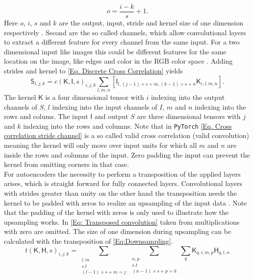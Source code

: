 \documentclass[12pt, a4paper]{article}
\begin{document}
\begin{equation}\label{Eq:Downsampling}
	o = \frac{i -k}{s} + 1.
\end{equation} 
Here \(o\), \(i\), \(s\) and \(k\) are the output, input, stride and kernel size of one dimension respectively \cite{dumoulin2018guide}. Second are the so called channels, which allow convolutional layers to extract a different feature for every channel from the same input. For a two dimensional input like images this could be different features for the same location on the image, like edges and color in the RGB color space \cite{Goodfellow}. Adding strides and kernel to \cref{Eq. Discrete Cross Correlation} yields
\begin{equation}
	\mathsf{S}_{i,j,k} = c(\mathsf{K},\mathsf{I},s)_{i,j,k}\sum_{l,m,n}\left[\mathsf{I}_{l,(j-1)\times s+m,(k -1)\times s+n}\mathsf{K}_{i,l,m,n}\right]. \label{Eq. Cross correlation stride channel}
\end{equation}
The kernel \(\mathsf{K}\) is a four dimensional tensor with \(i\) indexing into the output channels of \(S\), \(l\) indexing into the input channels of \(I\), \(m\) and \(n\) indexing into the rows and colums. The input \(\mathsf{I}\) and output \(S\) are three dimensional tensors with \(j\) and \(k\) indexing into the rows and columns. Note that in \texttt{PyTorch} \cref{Eq. Cross correlation stride channel} is a so called valid cross correlation (valid convolution) \cite{bibid} meaning the kernel will only move over input units for which  all \(m\) and \(n\) are inside the rows and columns of the input. Zero padding the input can prevent the kernel from omitting corners in that case.
\\
For autoencoders the necessity to perform a transposition of the applied layers arises, which is straight forward for fully connected layers. Convolutional layers with strides greater than unity on the other hand  the transposition needs the kernel to be padded with zeros to realize an upsampling of the input data \cite{dumoulin2018guide}. Note that the padding of the kernel with zeros is only used to illustrate how the upsampling works. In \cref{Eq: Transposed convolution} taken from \cite{Goodfellow} multiplications with zero are omitted. The size of one dimension during upsampling can be calculated with the transposition of \cref{Eq:Downsampling}.
\begin{equation}\label{Eq: Transposed convolution}
	t(\mathsf{K},\mathsf{H},s)_{i,j,k} = \sum_{\substack{l,m\\s.t\\(l-1)\times s+m=j}}
												  \sum_{\substack{n,p\\s.t\\(n-1)\times s+p=k}}
												  \sum_q \mathsf{K}_{q,i,m,p}\mathsf{H}_{q,l,n} 
\end{equation}
\end{document}
